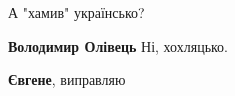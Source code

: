 \begin{itemize}
\begin{itemize}
 
А "хамив" українсько?

 
\textbf{Володимир Олівець} Ні, хохляцько.

 
\textbf{Євгене}, виправляю
\end{itemize}

\end{itemize}

